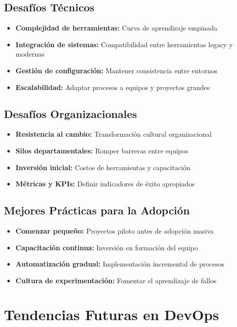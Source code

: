 \documentclass[12pt,a4paper]{article}
\begin{document}
\subsection{Desafíos Técnicos}
\begin{itemize}
    \item \textbf{Complejidad de herramientas:} Curva de aprendizaje empinada
    \item \textbf{Integración de sistemas:} Compatibilidad entre herramientas legacy y modernas
    \item \textbf{Gestión de configuración:} Mantener consistencia entre entornos
    \item \textbf{Escalabilidad:} Adaptar procesos a equipos y proyectos grandes
\end{itemize}

\subsection{Desafíos Organizacionales}
\begin{itemize}
    \item \textbf{Resistencia al cambio:} Transformación cultural organizacional
    \item \textbf{Silos departamentales:} Romper barreras entre equipos
    \item \textbf{Inversión inicial:} Costos de herramientas y capacitación
    \item \textbf{Métricas y KPIs:} Definir indicadores de éxito apropiados
\end{itemize}

\subsection{Mejores Prácticas para la Adopción}
\begin{itemize}
    \item \textbf{Comenzar pequeño:} Proyectos piloto antes de adopción masiva
    \item \textbf{Capacitación continua:} Inversión en formación del equipo
    \item \textbf{Automatización gradual:} Implementación incremental de procesos
    \item \textbf{Cultura de experimentación:} Fomentar el aprendizaje de fallos
\end{itemize}

\section{Tendencias Futuras en DevOps}
\end{document}
